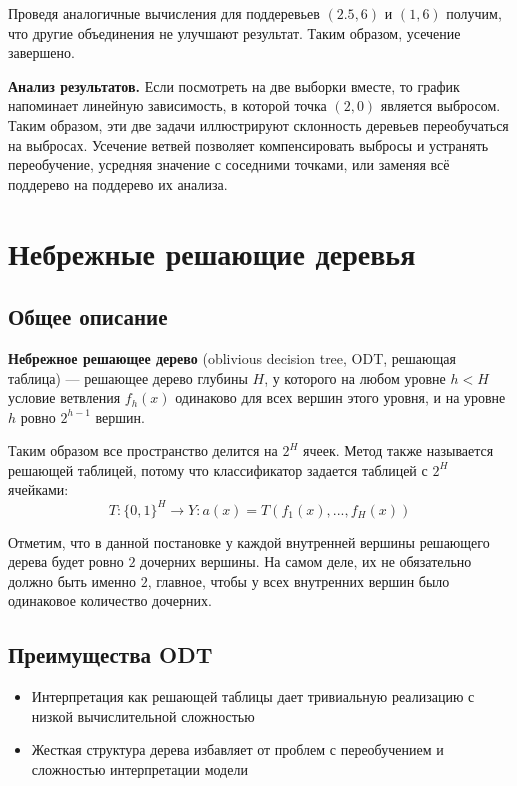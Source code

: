 Проведя аналогичные вычисления для поддеревьев $(2.5, 6)$ и $(1, 6)$ получим, что другие объединения не улучшают результат. Таким образом, усечение завершено.

\textbf{Анализ результатов.} Если посмотреть на две выборки вместе, то график напоминает линейную зависимость, в которой точка $(2, 0)$ является выбросом. Таким образом, эти две задачи иллюстрируют склонность деревьев переобучаться на выбросах. Усечение ветвей позволяет компенсировать выбросы и устранять переобучение, усредняя значение с соседними точками, или заменяя всё поддерево на поддерево их анализа. 


\section{Небрежные решающие деревья}

\subsection{Общее описание}

\textbf{Небрежное решающее дерево} (oblivious decision tree, ODT, решающая таблица) --- решающее дерево глубины $H$,
у которого на любом уровне $h < H$ условие ветвления $f_h(x)$ одинаково для всех вершин этого уровня, и на 
уровне $h$ ровно $2^{h-1}$ вершин.

Таким образом все пространство делится на $2^H$ ячеек. Метод также называется решающей таблицей, потому что классификатор
задается таблицей с $2^H$ ячейками:
\begin{equation*}
    T: \{0, 1\}^H \rightarrow Y: a(x) = T(f_1(x), ..., f_H(x))
\end{equation*}

Отметим, что в данной постановке у каждой внутренней вершины решающего дерева будет ровно $2$ дочерних вершины. На самом деле,
их не обязательно должно быть именно $2$, главное, чтобы у всех внутренних вершин было одинаковое количество дочерних.

\subsection{Преимущества ODT}
\begin{itemize}
    \item Интерпретация как решающей таблицы дает тривиальную реализацию с низкой вычислительной сложностью
    \item Жесткая структура дерева избавляет от проблем с переобучением и сложностью интерпретации модели
\end{itemize}

